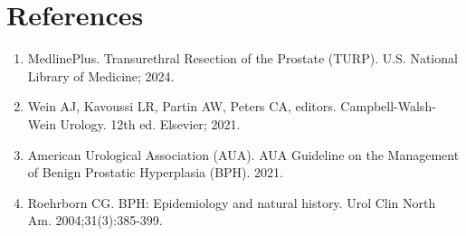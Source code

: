 \section*{References}
\begin{enumerate}
  \item MedlinePlus. Transurethral Resection of the Prostate (TURP). U.S. National Library of Medicine; 2024.
  \item Wein AJ, Kavoussi LR, Partin AW, Peters CA, editors. Campbell-Walsh-Wein Urology. 12th ed. Elsevier; 2021.
  \item American Urological Association (AUA). AUA Guideline on the Management of Benign Prostatic Hyperplasia (BPH). 2021.
  \item Roehrborn CG. BPH: Epidemiology and natural history. Urol Clin North Am. 2004;31(3):385-399.
\end{enumerate}

\clearpage
